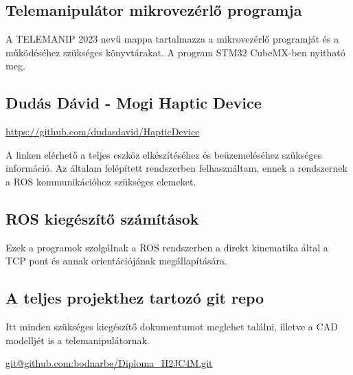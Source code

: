 \appendix
\chapter*{\melleklet}
\setcounter{chapter}{\annexletter} %
\setcounter{section}{0}

\section{Telemanipulátor mikrovezérlő programja}
\label{sec:melleklet_1}
A TELEMANIP 2023 nevű mappa tartalmazza a mikrovezérlő programját és a
működéséhez szükséges könyvtárakat. A program STM32 CubeMX-ben nyitható meg.

\section{Dudás Dávid - Mogi Haptic Device}
\label{sec:melleklet_2}
\url{https://github.com/dudasdavid/HapticDevice}

A linken elérhető a teljes eszköz elkészítéséhez és beüzemeléséhez szükséges információ.
Az általam felépített rendszerben felhasználtam, ennek a rendszernek a ROS
kommunikációhoz szükséges elemeket.

\section{ROS kiegészítő számítások}
\label{sec:melleklet_3}
Ezek a programok szolgálnak a ROS rendszerben a direkt kinematika által a TCP pont
és annak orientációjának megállapítására.

\section{A teljes projekthez tartozó git repo}
\label{sec:melleklet_4}
Itt minden szükséges kiegészítő dokumentumot meglehet találni, illetve a CAD modelljét is a telemanipulátornak.

\url{git@github.com:bodnarbe/Diploma_H2JC4M.git}

